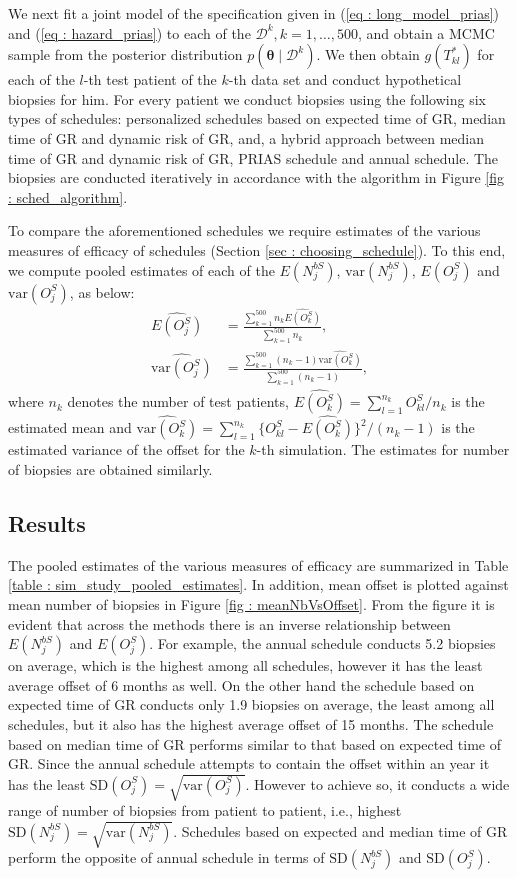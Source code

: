 We next fit a joint model of the specification given in (\ref{eq : long_model_prias}) and (\ref{eq : hazard_prias}) to each of the $\mathcal{D}^k, k=1, \ldots, 500$, and obtain a MCMC sample from the posterior distribution $p(\boldsymbol{\theta} \mid \mathcal{D}^k)$. We then obtain $g(T^*_{kl})$ for each of the $l$-th test patient of the $k$-th data set and conduct hypothetical biopsies for him. For every patient we conduct biopsies using the following six types of schedules: personalized schedules based on expected time of GR, median time of GR and dynamic risk of GR, and, a hybrid approach between median time of GR and dynamic risk of GR, PRIAS schedule and annual schedule. The biopsies are conducted iteratively in accordance with the algorithm in Figure \ref{fig : sched_algorithm}. 

To compare the aforementioned schedules we require estimates of the various measures of efficacy of schedules (Section \ref{sec : choosing_schedule}). To this end, we compute pooled estimates of each of the $E(N^{bS}_j)$, $\mbox{var}(N^{bS}_j)$, $E(O^S_j)$ and $\mbox{var}(O^S_j)$, as below:
\begin{align*}
\widehat{E(O^S_j)} &= \frac{\sum_{k=1}^{500} n_k \widehat{E(O^S_k)}}{\sum_{k=1}^{500} n_k}, \\
\widehat{\mbox{var}(O^S_j)} &= \frac{\sum_{k=1}^{500} (n_k - 1) \widehat{\mbox{var}(O^S_k)}}{\sum_{k=1}^{500} (n_k-1)}, 
\end{align*}
where $n_k$ denotes the number of test patients, $\widehat{E(O^S_k)} = {\sum_{l=1}^{n_k}O^S_{kl}}/{n_k}$ is the estimated mean and $\widehat{\mbox{var}(O^S_k)} = {\sum_{l=1}^{n_k}\big\{O^S_{kl} - \widehat{E(O^S_k)}\big\}^2}/(n_k-1)$ is the estimated variance of the offset for the $k$-th simulation. The estimates for number of biopsies are obtained similarly.

\subsection{Results}
The pooled estimates of the various measures of efficacy are summarized in Table \ref{table : sim_study_pooled_estimates}. In addition, mean offset is plotted against mean number of biopsies in Figure \ref{fig : meanNbVsOffset}. From the figure it is evident that across the methods there is an inverse relationship between $E(N^{bS}_j)$ and $E(O^S_j)$. For example, the annual schedule conducts 5.2 biopsies on average, which is the highest among all schedules, however it has the least average offset of 6 months as well. On the other hand the schedule based on expected time of GR conducts only 1.9 biopsies on average, the least among all schedules, but it also has the highest average offset of 15 months. The schedule based on median time of GR performs similar to that based on expected time of GR. Since the annual schedule attempts to contain the offset within an year it has the least $\mbox{SD}(O^S_j) = \sqrt{\mbox{var}(O^S_j)}$. However to achieve so, it conducts a wide range of number of biopsies from patient to patient, i.e., highest $\mbox{SD}(N^{bS}_j) = \sqrt{\mbox{var}(N^{bS}_j)}$. Schedules based on expected and median time of GR perform the opposite of annual schedule in terms of $\mbox{SD}(N^{bS}_j)$ and $\mbox{SD}(O^S_j)$.

